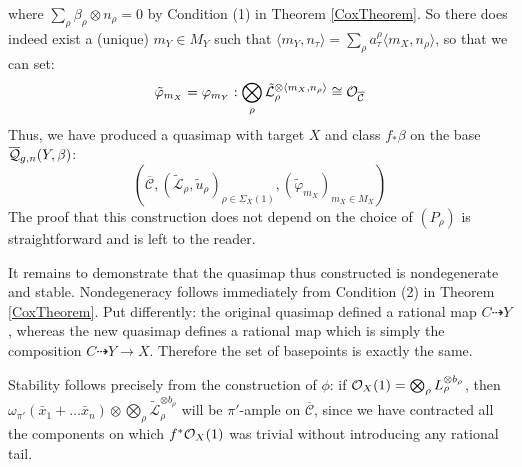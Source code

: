 where $\sum_\rho \beta_\rho \otimes n_\rho = 0$ by Condition (1) in Theorem \ref{CoxTheorem}. So there does indeed exist a (unique) $m_Y \in M_Y$ such that $\langle m_Y, n_\tau \rangle = \sum_\rho a_\tau^\rho \langle m_X, n_\rho \rangle$, so that we can set:
\begin{equation*} \tilde{\varphi}_{m_X} = \varphi_{m_Y} : \bigotimes_\rho \tilde{\mathcal L}_\rho^{\otimes \langle m_X, n_\rho \rangle} \cong \mathcal{O}_{\overline{\mathcal C}} \end{equation*}
Thus, we have produced a quasimap with target $X$ and class $f_*\beta$ on the base $\overline{\mathcal Q}_{g,n}(Y,\beta)$:
\begin{equation*} (\overline{\mathcal C}, (\tilde{\mathcal L}_\rho, \tilde{u}_\rho)_{\rho \in \Sigma_X(1)}, (\tilde{\varphi}_{m_X})_{m_X \in M_X}) \end{equation*}
The proof that this construction does not depend on the choice of $(P_\rho)$ is straightforward and is left to the reader.

It remains to demonstrate that the quasimap thus constructed is nondegenerate and stable. Nondegeneracy follows immediately from Condition (2) in Theorem \ref{CoxTheorem}. Put differently: the original quasimap defined a rational map $C \dashrightarrow Y$, whereas the new quasimap defines a rational map which is simply the composition $C \dashrightarrow Y \to X$. Therefore the set of basepoints is exactly the same.

Stability follows precisely from the construction of $\phi$: if $\mathcal{O}_X(1) = \bigotimes_\rho L_\rho^{\otimes b_\rho}$, then $\omega_{\pi'}(\bar x_1+\ldots \bar x_n)\otimes\bigotimes_\rho \tilde{\mathcal L}_\rho^{\otimes b_\rho}$ will be $\pi'$-ample on $\overline{\mathcal C}$, since we have contracted all the components on which $f^*\mathcal{O}_X(1)$ was trivial without introducing any rational tail.


